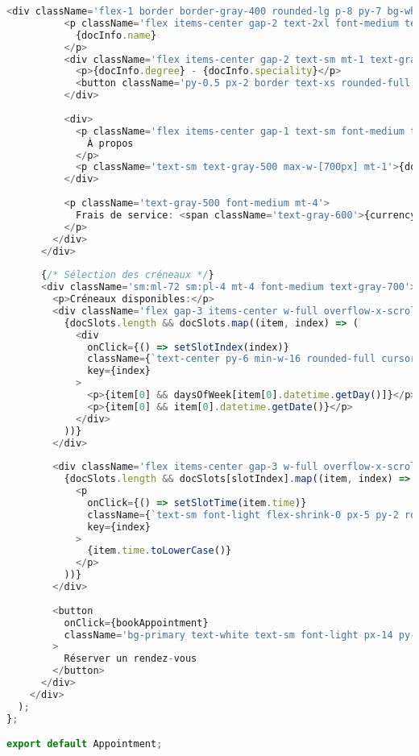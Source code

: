 \begin{lstlisting}[language=JavaScript, caption=Composant de réservation]
        <div className='flex-1 border border-gray-400 rounded-lg p-8 py-7 bg-white mx-2 sm:mx-0 mt-[-80px] sm:mt-0'>
          <p className='flex items-center gap-2 text-2xl font-medium text-gray-900'>
            {docInfo.name}
          </p>
          <div className='flex items-center gap-2 text-sm mt-1 text-gray-600'>
            <p>{docInfo.degree} - {docInfo.speciality}</p>
            <button className='py-0.5 px-2 border text-xs rounded-full'>{docInfo.experience}</button>
          </div>
          
          <div>
            <p className='flex items-center gap-1 text-sm font-medium text-gray-900 mt-3'>
              À propos
            </p>
            <p className='text-sm text-gray-500 max-w-[700px] mt-1'>{docInfo.about}</p>
          </div>
          
          <p className='text-gray-500 font-medium mt-4'>
            Frais de service: <span className='text-gray-600'>{currencySymbol}{docInfo.fees}</span>
          </p>
        </div>
      </div>
      
      {/* Sélection des créneaux */}
      <div className='sm:ml-72 sm:pl-4 mt-4 font-medium text-gray-700'>
        <p>Créneaux disponibles:</p>
        <div className='flex gap-3 items-center w-full overflow-x-scroll mt-4'>
          {docSlots.length && docSlots.map((item, index) => (
            <div 
              onClick={() => setSlotIndex(index)} 
              className={`text-center py-6 min-w-16 rounded-full cursor-pointer ${slotIndex === index ? 'bg-primary text-white' : 'border border-gray-200'}`} 
              key={index}
            >
              <p>{item[0] && daysOfWeek[item[0].datetime.getDay()]}</p>
              <p>{item[0] && item[0].datetime.getDate()}</p>
            </div>
          ))}
        </div>
        
        <div className='flex items-center gap-3 w-full overflow-x-scroll mt-4'>
          {docSlots.length && docSlots[slotIndex].map((item, index) => (
            <p 
              onClick={() => setSlotTime(item.time)} 
              className={`text-sm font-light flex-shrink-0 px-5 py-2 rounded-full cursor-pointer ${item.time === slotTime ? 'bg-primary text-white' : 'text-gray-400 border border-gray-300'}`} 
              key={index}
            >
              {item.time.toLowerCase()}
            </p>
          ))}
        </div>
        
        <button 
          onClick={bookAppointment} 
          className='bg-primary text-white text-sm font-light px-14 py-3 rounded-full my-6'
        >
          Réserver un rendez-vous
        </button>
      </div>
    </div>
  );
};

export default Appointment;
\end{lstlisting}

